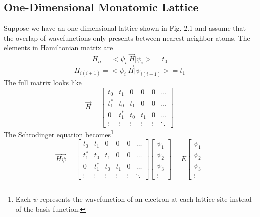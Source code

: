 \subsection{One-Dimensional Monatomic Lattice}
Suppose we have an one-dimensional lattice shown in Fig. 2.1 and assume that the overlap of wavefunctions only presents between nearest neighbor atoms. The elements in Hamiltonian matrix are \begin{equation}
    H_{ii} = \big<\psi_{i}\big|\vec{H}\big|\psi_{i}\big> = t_{0}
\end{equation} \begin{equation}
    H_{i(i\pm 1)} = \big<\psi_{i}\big|\vec{H}\big|\psi_{i(i\pm 1)}\big> = t_{1}
\end{equation} The full matrix looks like \begin{equation}
    \vec{H} = \left[\begin{matrix}
    t_{0} & t_{1} & 0 & 0 & 0 & \ldots \\
    t_{1}^{*} & t_{0} & t_{1} & 0 & 0 & \ldots \\
    0 & t_{1}^{*} & t_{0} & t_{1} & 0 & \ldots \\
    \vdots & \vdots & \vdots & \vdots & \vdots & \ddots
    \end{matrix}
    \right]
\end{equation} The Schrodinger equation becomes\footnote{Each $\psi$ represents the wavefunction of an electron at each lattice site instead of the basis function.} \begin{equation}
    \vec{H}\vec{\psi} = \left[\begin{matrix}
    t_{0} & t_{1} & 0 & 0 & 0 & \ldots \\
    t_{1}^{*} & t_{0} & t_{1} & 0 & 0 & \ldots \\
    0 & t_{1}^{*} & t_{0} & t_{1} & 0 & \ldots \\
    \vdots & \vdots & \vdots & \vdots & \vdots & \ddots
    \end{matrix}
    \right] \left[ \begin{matrix}
    \psi_{1} \\
    \psi_{2} \\
    \psi_{3} \\
    \vdots
    \end{matrix}
    \right] = E\left[ \begin{matrix}
    \psi_{1} \\
    \psi_{2} \\
    \psi_{3} \\
    \vdots

\end{matrix}
\end{equation}
